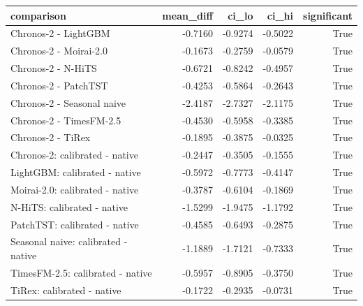 \begin{tabular}{lrrrr}
\toprule
comparison & mean_diff & ci_lo & ci_hi & significant \\
\midrule
Chronos-2 - LightGBM & -0.7160 & -0.9274 & -0.5022 & True \\
Chronos-2 - Moirai-2.0 & -0.1673 & -0.2759 & -0.0579 & True \\
Chronos-2 - N-HiTS & -0.6721 & -0.8242 & -0.4957 & True \\
Chronos-2 - PatchTST & -0.4253 & -0.5864 & -0.2643 & True \\
Chronos-2 - Seasonal naive & -2.4187 & -2.7327 & -2.1175 & True \\
Chronos-2 - TimesFM-2.5 & -0.4530 & -0.5958 & -0.3385 & True \\
Chronos-2 - TiRex & -0.1895 & -0.3875 & -0.0325 & True \\
Chronos-2: calibrated - native & -0.2447 & -0.3505 & -0.1555 & True \\
LightGBM: calibrated - native & -0.5972 & -0.7773 & -0.4147 & True \\
Moirai-2.0: calibrated - native & -0.3787 & -0.6104 & -0.1869 & True \\
N-HiTS: calibrated - native & -1.5299 & -1.9475 & -1.1792 & True \\
PatchTST: calibrated - native & -0.4585 & -0.6493 & -0.2875 & True \\
Seasonal naive: calibrated - native & -1.1889 & -1.7121 & -0.7333 & True \\
TimesFM-2.5: calibrated - native & -0.5957 & -0.8905 & -0.3750 & True \\
TiRex: calibrated - native & -0.1722 & -0.2935 & -0.0731 & True \\
\bottomrule
\end{tabular}
